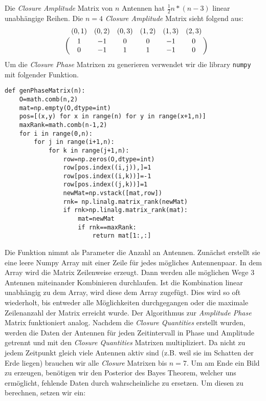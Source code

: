 Die \emph{Closure Amplitude} Matrix von $n$ Antennen hat $\frac{1}{2}n*(n-3)$ linear unabhängige Reihen. Die $n=4$ \emph{Closure Amplitude} Matrix sieht folgend aus:
\begin{equation}
\bordermatrix{
~ &(0,1)&(0,2)&(0,3)&(1,2)&(1,3)&(2,3)\cr
~&1&-1&0&0&-1&0 \cr
~&0&-1&1&1&-1&0 \cr
}
\end{equation}
Um die \emph{Closure Phase} Matrixen zu generieren verwendet wir die library \verb|numpy| mit folgender Funktion.
\begin{verbatim}
def genPhaseMatrix(n):
    O=math.comb(n,2)
    mat=np.empty(O,dtype=int)
    pos=[(x,y) for x in range(n) for y in range(x+1,n)]
    maxRank=math.comb(n-1,2)
    for i in range(0,n):
        for j in range(i+1,n):
            for k in range(j+1,n):
                row=np.zeros(O,dtype=int)
                row[pos.index((i,j)),]=1
                row[pos.index((i,k))]=-1
                row[pos.index((j,k))]=1
                newMat=np.vstack([mat,row])
                rnk= np.linalg.matrix_rank(newMat)
                if rnk>np.linalg.matrix_rank(mat):
                    mat=newMat
                    if rnk==maxRank:
                        return mat[1:,:]
\end{verbatim}
Die Funktion nimmt als Parameter die Anzahl an Antennen. Zunächst erstellt sie eine leere Numpy Array mit einer Zeile für jedes mögliches Antennenpaar. In dem Array wird die Matrix Zeilenweise erzeugt. Dann werden alle möglichen Wege 3 Antennen miteinander Kombinieren durchlaufen. Ist die Kombination linear unabhängig zu dem Array, wird diese dem Array zugefügt. Dies wird so oft wiederholt, bis entweder alle Möglichkeiten durchgegangen oder die maximale Zeilenanzahl der Matrix erreicht wurde. Der Algorithmus zur \emph{Amplitude Phase} Matrix funktioniert analog.
Nachdem die \emph{Closure Quantities} erstellt wurden, werden die Daten der Antennen für jeden Zeitintervall in Phase und Amplitude getrennt und mit den \emph{Closure Quantities} Matrixen multipliziert. Da nicht zu jedem Zeitpunkt gleich viele Antennen aktiv sind (z.B. weil sie im Schatten der Erde liegen) brauchen wir alle \emph{Closure} Matrixen bis $n=7$.
Um am Ende ein Bild zu erzeugen, benötigen wir den Posterior des Bayes Theorem, welcher uns ermöglicht, fehlende Daten durch wahrscheinliche zu ersetzen. Um diesen zu berechnen, setzen wir ein:

